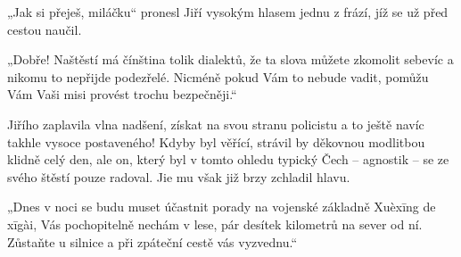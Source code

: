 „Jak si přeješ, miláčku“ pronesl Jiří vysokým hlasem jednu z frází, jíž se už před cestou naučil.

„Dobře! Naštěstí má čínština tolik dialektů, že ta slova můžete zkomolit sebevíc a nikomu to nepřijde podezřelé. Nicméně pokud Vám to nebude vadit, pomůžu Vám Vaši misi provést trochu bezpečněji.“

 Jiřího zaplavila vlna nadšení, získat na svou stranu policistu a to ještě navíc takhle vysoce postaveného! Kdyby byl věřící, strávil by děkovnou modlitbou klidně celý den, ale on, který byl v tomto ohledu typický Čech – agnostik – se ze svého štěstí pouze radoval. Jie mu však již brzy zchladil hlavu.
 
„Dnes v noci se budu muset účastnit porady na vojenské základně Xuèxīng de xīgài, Vás pochopitelně nechám v lese, pár desítek kilometrů na sever od ní. Zůstaňte u silnice a při zpáteční cestě vás vyzvednu.“
